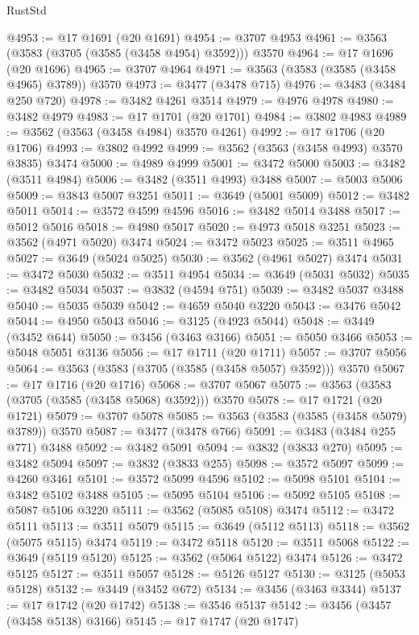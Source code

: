 \begin{lexlean}{RustStd}
\begin{coremodule}
@4953 := @17 @1691 (@20 @1691)
@4954 := @3707 @4953
@4961 := @3563 (@3583 (@3705 (@3585 (@3458 @4954) @3592))) @3570
@4964 := @17 @1696 (@20 @1696)
@4965 := @3707 @4964
@4971 := @3563 (@3583 (@3585 (@3458 @4965) @3789)) @3570
@4973 := @3477 (@3478 @715)
@4976 := @3483 (@3484 @250 @720)
@4978 := @3482 @4261 @3514
@4979 := @4976 @4978
@4980 := @3482 @4979
@4983 := @17 @1701 (@20 @1701)
@4984 := @3802 @4983
@4989 := @3562 (@3563 (@3458 @4984) @3570 @4261)
@4992 := @17 @1706 (@20 @1706)
@4993 := @3802 @4992
@4999 := @3562 (@3563 (@3458 @4993) @3570 @3835) @3474
@5000 := @4989 @4999
@5001 := @3472 @5000
@5003 := @3482 (@3511 @4984)
@5006 := @3482 (@3511 @4993) @3488
@5007 := @5003 @5006
@5009 := @3843 @5007 @3251
@5011 := @3649 (@5001 @5009)
@5012 := @3482 @5011
@5014 := @3572 @4599 @4596
@5016 := @3482 @5014 @3488
@5017 := @5012 @5016
@5018 := @4980 @5017
@5020 := @4973 @5018 @3251
@5023 := @3562 (@4971 @5020) @3474
@5024 := @3472 @5023
@5025 := @3511 @4965
@5027 := @3649 (@5024 @5025)
@5030 := @3562 (@4961 @5027) @3474
@5031 := @3472 @5030
@5032 := @3511 @4954
@5034 := @3649 (@5031 @5032)
@5035 := @3482 @5034
@5037 := @3832 (@4594 @751)
@5039 := @3482 @5037 @3488
@5040 := @5035 @5039
@5042 := @4659 @5040 @3220
@5043 := @3476 @5042
@5044 := @4950 @5043
@5046 := @3125 (@4923 @5044)
@5048 := @3449 (@3452 @644)
@5050 := @3456 (@3463 @3166)
@5051 := @5050 @3466
@5053 := @5048 @5051 @3136
@5056 := @17 @1711 (@20 @1711)
@5057 := @3707 @5056
@5064 := @3563 (@3583 (@3705 (@3585 (@3458 @5057) @3592))) @3570
@5067 := @17 @1716 (@20 @1716)
@5068 := @3707 @5067
@5075 := @3563 (@3583 (@3705 (@3585 (@3458 @5068) @3592))) @3570
@5078 := @17 @1721 (@20 @1721)
@5079 := @3707 @5078
@5085 := @3563 (@3583 (@3585 (@3458 @5079) @3789)) @3570
@5087 := @3477 (@3478 @766)
@5091 := @3483 (@3484 @255 @771) @3488
@5092 := @3482 @5091
@5094 := @3832 (@3833 @270)
@5095 := @3482 @5094
@5097 := @3832 (@3833 @255)
@5098 := @3572 @5097
@5099 := @4260 @3461
@5101 := @3572 @5099 @4596
@5102 := @5098 @5101
@5104 := @3482 @5102 @3488
@5105 := @5095 @5104
@5106 := @5092 @5105
@5108 := @5087 @5106 @3220
@5111 := @3562 (@5085 @5108) @3474
@5112 := @3472 @5111
@5113 := @3511 @5079
@5115 := @3649 (@5112 @5113)
@5118 := @3562 (@5075 @5115) @3474
@5119 := @3472 @5118
@5120 := @3511 @5068
@5122 := @3649 (@5119 @5120)
@5125 := @3562 (@5064 @5122) @3474
@5126 := @3472 @5125
@5127 := @3511 @5057
@5128 := @5126 @5127
@5130 := @3125 (@5053 @5128)
@5132 := @3449 (@3452 @672)
@5134 := @3456 (@3463 @3344)
@5137 := @17 @1742 (@20 @1742)
@5138 := @3546 @5137
@5142 := @3456 (@3457 (@3458 @5138) @3166)
@5145 := @17 @1747 (@20 @1747)

\end{coremodule}
\end{lexlean}
